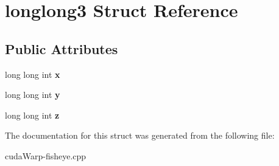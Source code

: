 \hypertarget{structlonglong3}{}\section{longlong3 Struct Reference}
\label{structlonglong3}
\subsection*{Public Attributes}
\begin{DoxyCompactItemize}
\item 
long long int {\bfseries x}\hypertarget{structlonglong3_a3267366e7872ccc3e7a1672411d7341b}{}\label{structlonglong3_a3267366e7872ccc3e7a1672411d7341b}

\item 
long long int {\bfseries y}\hypertarget{structlonglong3_a080a490796e126255d01b8b83adc0351}{}\label{structlonglong3_a080a490796e126255d01b8b83adc0351}

\item 
long long int {\bfseries z}\hypertarget{structlonglong3_a1ab08608d4cb5c15950e838025ba43c5}{}\label{structlonglong3_a1ab08608d4cb5c15950e838025ba43c5}

\end{DoxyCompactItemize}


The documentation for this struct was generated from the following file\+:\begin{DoxyCompactItemize}
\item 
cuda\+Warp-\/fisheye.\+cpp\end{DoxyCompactItemize}
